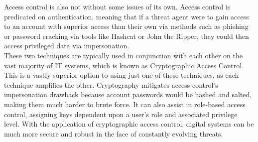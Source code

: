 \documentclass[12pt]{report}
\begin{document}
    \noindent Access control is also not without some issues of its own.
    Access control is predicated on authentication, meaning that if a threat agent were to gain access to an account
    with superior access than their own via methods such as phishing or password cracking via tools like Hashcat or
    John the Ripper, they could then access privileged data via impersonation.\\

    \noindent These two techniques are typically used in conjunction with each other on the vast majority of
    IT systems, which is known as Cryptographic Access Control.
    This is a vastly superior option to using just one of these techniques, as each technique amplifies the other.
    Cryptography mitigates access control's impersonation drawback because account passwords
    would be hashed and salted, making them much harder to brute force.
    It can also assist in role-based access control, assigning keys dependent upon a user's role
    and associated privilege level.
    With the application of cryptographic access control, digital systems can be much more secure and robust
    in the face of constantly evolving threats.


    \printbibliography
\end{document}
